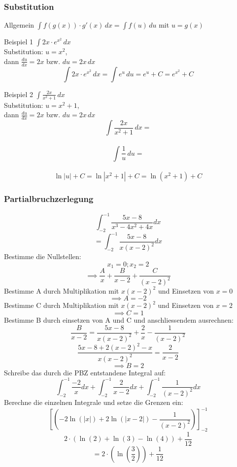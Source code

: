 \documentclass[a4paper,fontsize = 7pt]{scrartcl}
\begin{document}
\subsubsection{Substitution}
	\begin{subbox}{Allgemein}
		$\int f(g(x)) \cdot g'(x) \, dx = \int f(u) \, du$ mit $u = g(x)$
	\end{subbox}
	\begin{subbox}{Beispiel 1}
		$\int 2x \cdot e^{x^2} \, dx$ \\
		Substitution: $u = x^2$, \\
		dann $\frac{du}{dx} = 2x$ bzw. $du = 2x \, dx$
		$$\int 2x \cdot e^{x^2} \, dx = \int e^u \, du = e^u + C = e^{x^2} + C$$
	\end{subbox}
	\begin{subbox}{Beispiel 2}
		$\int \frac{2x}{x^2+1} \, dx$ \\
		Substitution: $u = x^2 + 1$, \\
		dann $\frac{du}{dx} = 2x$ bzw. $du = 2x \, dx$
		\[\int \frac{2x}{x^2+1} \, dx = \] \\
		\[\int \frac{1}{u} \, du = \] \\
		\[\ln|u| + C = \ln|x^2+1| + C = \ln(x^2+1) + C\]
	 \end{subbox}

\subsubsection{Partialbruchzerlegung}
    \[\int_{-2}^{-1}\frac{5x-8}{x^3 -4x^2 +4x}dx\]
    \[=\int_{-2}^{-1}\frac{5x-8}{x(x-2)^2}dx\]
    Bestimme die Nullstellen:
    \[x_1 =0; x_2 =2\]
    \[\implies \frac{A}{x}+\frac{B}{x-2}+\frac{C}{(x-2)^2}\]
    Bestimme A durch Multiplikation mit $x(x-2)^2$ und Einsetzen von $x=0$
    \[\implies A=-2\]
    Bestimme C durch Multiplikation mit $x(x-2)^2$ und Einsetzen von $x=2$
    \[\implies C=1\]
    Bestimme B durch einsetzen von A und C und anschliessendem ausrechnen:
    \[\frac{B}{x-2}=\frac{5x-8}{x(x-2)^2}+\frac{2}{x}-\frac{1}{(x-2)^2}\]
    \[\frac{5x-8+2(x-2)^2 -x}{x(x-2)^2} = \frac{2}{x-2}\]
    \[\implies B=2\]
    Schreibe das durch die PBZ entstandene Integral auf:
    \[\int_{-2}^{-1}\frac{-2}{x}dx+\int_{-2}^{-1}\frac{2}{x-2}dx+\int_{-2}^{-1}\frac{1}{(x-2)^2}dx\]
    Berechne die einzelnen Integrale und setze die Grenzen ein:
    \[\left[(-2\ln(\lvert x\rvert)+2\ln(\lvert x-2\rvert)-\frac{1}{(x-2)^2})\right]_{-2}^{-1}\]
    \[2\cdot(\ln(2)+\ln(3)-\ln(4))+\frac{1}{12}\]
    \[=2\cdot\left(\ln\left(\frac{3}{2}\right)\right)+\frac{1}{12}\]
\end{document}

